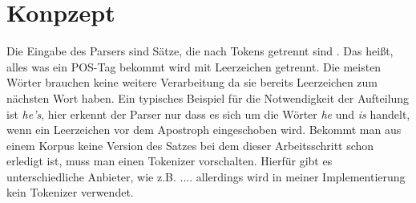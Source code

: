 %
\chapter{Konpzept}
\label{sec:konzept}

Die Eingabe des Parsers sind Sätze, die nach Tokens getrennt sind . Das heißt, alles was ein POS-Tag bekommt wird mit Leerzeichen getrennt. Die meisten Wörter brauchen keine weitere Verarbeitung da sie bereits Leerzeichen zum nächsten Wort haben. Ein typisches Beispiel für die Notwendigkeit der Aufteilung ist \textit{he's}, hier erkennt der Parser nur dass es sich um die Wörter \textit{he} und \textit{is} handelt, wenn ein Leerzeichen vor dem Apostroph eingeschoben wird. Bekommt man aus einem Korpus keine Version des Satzes bei dem dieser Arbeitsschritt schon erledigt ist, muss man einen Tokenizer vorschalten. Hierfür gibt es unterschiedliche Anbieter, wie z.B. .... %
allerdings wird in meiner Implementierung kein Tokenizer verwendet.